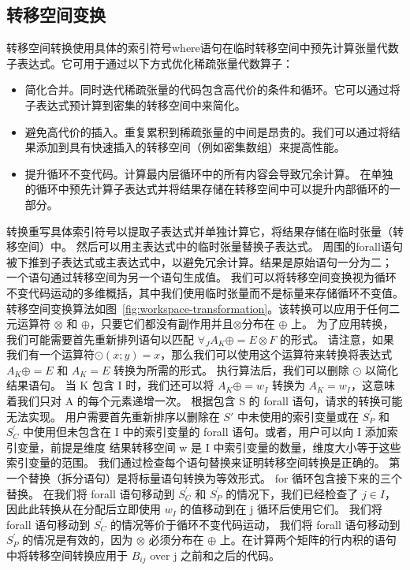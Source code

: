 \begin{translation}
\section{转移空间变换}
转移空间转换使用具体的索引符号where语句在临时转移空间中预先计算张量代数子表达式。它可用于通过以下方式优化稀疏张量代数算子：
\begin{itemize}
 \item 简化合并。同时迭代稀疏张量的代码包含高代价的条件和循环。它可以通过将子表达式预计算到密集的转移空间中来简化。 
 \item 避免高代价的插入。重复累积到稀疏张量的中间是昂贵的。我们可以通过将结果添加到具有快速插入的转移空间（例如密集数组）来提高性能。 
 \item 提升循环不变代码。计算最内层循环中的所有内容会导致冗余计算。 在单独的循环中预先计算子表达式并将结果存储在转移空间中可以提升内部循环的一部分。
\end{itemize} 
转换重写具体索引符号以提取子表达式并单独计算它，将结果存储在临时张量（转移空间）中。 然后可以用主表达式中的临时张量替换子表达式。 
周围的forall语句被下推到子表达式或主表达式中，以避免冗余计算。结果是原始语句一分为二； 一个语句通过转移空间为另一个语句生成值。 
我们可以将转移空间变换视为循环不变代码运动的多维概括，其中我们使用临时张量而不是标量来存储循环不变值。
转移空间变换算法如图~\ref{fig:workspace-transformation}。该转换可以应用于任何二元运算符 $\otimes$ 和 $\oplus$，只要它们都没有副作用并且$\otimes$分布在 $\oplus$ 上。 为了应用转换，我们可能需要首先重新排列语句以匹配 $\forall_J A_K \oplus= E \otimes F$ 的形式。
请注意，如果我们有一个运算符$\odot(x;y) = x$，那么我们可以使用这个运算符来转换将表达式 $A_K \oplus= E$ 和 $A_K = E$ 转换为所需的形式。
执行算法后，我们可以删除 $\odot$ 以简化结果语句。 当 K 包含 I 时，我们还可以将 $A_K \oplus= w_I$ 转换为 $A_K = w_I$，这意味着我们只对 A 的每个元素递增一次。 根据包含 S 的 forall 语句，请求的转换可能无法实现。 
用户需要首先重新排序以删除在 $S'$ 中未使用的索引变量或在 $S^{'}_P$ 和 $S^{'}_C$ 中使用但未包含在 I 中的索引变量的 forall 语句。或者，用户可以向 I 添加索引变量，前提是维度 结果转移空间 w 是 I 中索引变量的数量，维度大小等于这些索引变量的范围。 
我们通过检查每个语句替换来证明转移空间转换是正确的。 第一个替换（拆分语句）是将标量语句转换为等效形式。 for 循环包含接下来的三个替换。 
在我们将 forall 语句移动到 $S^{'}_C$  和 $S^{'}_P$ 的情况下，我们已经检查了 $j \in I$，因此此转换从在分配后立即使用 $w_I$ 的值移动到在 j 循环后使用它们。 我们将 forall 语句移动到 $S^{'}_C$ 的情况等价于循环不变代码运动，
我们将 forall 语句移动到 $S^{'}_P$ 的情况是有效的，因为 $\otimes$ 必须分布在 $\oplus$ 上。在计算两个矩阵的行内积的语句中将转移空间转换应用于 $B_{ij}$ over j 之前和之后的代码。 

\end{translation}
